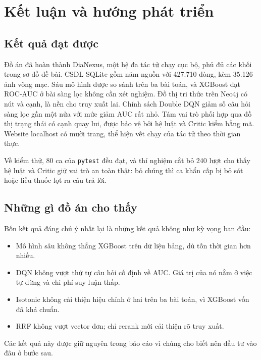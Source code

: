 \chapter{Kết luận và hướng phát triển}\label{chap:ketluan}

\section{Kết quả đạt được}

Đồ án đã hoàn thành DiaNexus, một hệ đa tác tử chạy cục bộ, phủ đủ các khối trong sơ đồ đề bài. CSDL SQLite gồm năm nguồn với 427.710 dòng, kèm 35.126 ảnh võng mạc. Sáu mô hình được so sánh trên ba bài toán, và XGBoost đạt ROC-AUC  ở bài sàng lọc không cần xét nghiệm. Đồ thị tri thức trên Neo4j có  nút và  cạnh, là nền cho truy xuất lai. Chính sách Double DQN giảm số câu hỏi sàng lọc gần một nửa với mức giảm AUC rất nhỏ. Tám vai trò phối hợp qua đồ thị trạng thái có cạnh quay lui, được bảo vệ bởi hệ luật và Critic kiểm bằng mã. Website localhost có mười trang, thể hiện vết chạy của tác tử theo thời gian thực.

Về kiểm thử, 80 ca của \texttt{pytest} đều đạt, và thí nghiệm cắt bỏ 240 lượt cho thấy hệ luật và Critic giữ vai trò an toàn thật: bỏ chúng thì ca khẩn cấp bị bỏ sót hoặc liều thuốc lọt ra câu trả lời.

\section{Những gì đồ án cho thấy}

Bốn kết quả đáng chú ý nhất lại là những kết quả không như kỳ vọng ban đầu:

\begin{itemize}
  \item Mô hình sâu không thắng XGBoost trên dữ liệu bảng, dù tốn thời gian hơn nhiều.
  \item DQN không vượt thứ tự câu hỏi cố định về AUC. Giá trị của nó nằm ở việc tự dừng và chi phí suy luận thấp.
  \item Isotonic không cải thiện hiệu chỉnh ở hai trên ba bài toán, vì XGBoost vốn đã khá chuẩn.
  \item RRF không vượt vector đơn; chỉ rerank mới cải thiện rõ truy xuất.
\end{itemize}

Các kết quả này được giữ nguyên trong báo cáo vì chúng cho biết nên đầu tư vào đâu ở bước sau.

